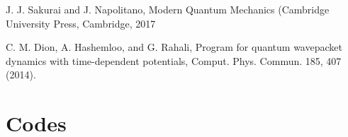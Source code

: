 \newpage
\pagestyle{fancy}
\headheight 30pt
\rhead{\small \myTitle}
\lhead{\small \myAuthor \today}
\cfoot{\thepage}

\tableofcontents
\newpage








\begin{thebibliography}{}
   J. J. Sakurai and J. Napolitano, Modern Quantum Mechanics (Cambridge
  University Press, Cambridge, 2017

  C. M. Dion, A. Hashemloo, and G. Rahali, Program for quantum wavepacket
dynamics with time-dependent potentials, Comput. Phys. Commun.
185, 407 (2014).

\end{thebibliography}

\appendix
\section{Codes}
\label{sec:Appendix}






